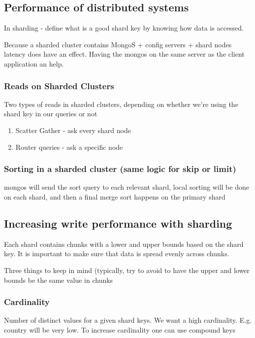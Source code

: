 \documentclass[11pt]{article}
\begin{document}
\subsection{Performance of distributed systems}
\label{sec:org5500721}
In sharding - define what is a good shard key by knowing how data is accessed. 

Because a sharded cluster contains MongoS + config servers + shard nodes latency does have an effect. Having the mongos on the same server as the client application an help.

\subsubsection{Reads on Sharded Clusters}
\label{sec:org00b80ad}
Two types of reads in sharded clusters, depending on whether we're using the shard key in our queries or not
\begin{enumerate}
\item Scatter Gather - ask every shard node
\item Router queries - ask a specific node
\end{enumerate}

\subsubsection{Sorting in a sharded cluster (same logic for skip or limit)}
\label{sec:org5d3a349}
mongos will send the sort query to each relevant shard, local sorting will be done on each shard, and then a final merge sort happens on the primary shard

\subsection{Increasing write performance with sharding}
\label{sec:orge6d0042}
Each shard contains chunks with a lower and upper bounds based on the shard key. It is important to make sure that data is spread evenly across chunks.

Three things to keep in mind (typically, try to avoid to have the upper and lower bounds be the same value in chunks
\subsubsection{Cardinality}
\label{sec:org10fbaa1}
Number of distinct values for a given shard keys. We want a high cardinality. E.g. country will be very low. To increase cardinality one can use compound keys
\end{document}
